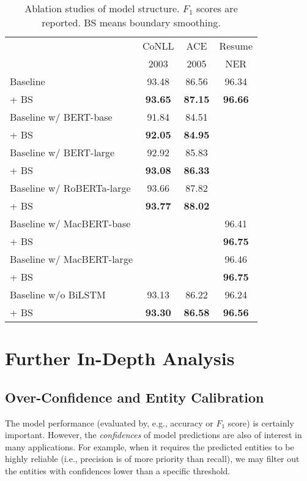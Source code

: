 \documentclass[11pt]{article}
\begin{document}
\begin{table}[t]
    \centering \small
    \begin{tabular}{lccc}
        \toprule
         & CoNLL & ACE  & Resume \\
         & 2003  & 2005 & NER \\
        \midrule
        Baseline                  & 93.48 & 86.56 & 96.34 \\
        \quad + BS                & \textbf{93.65} & \textbf{87.15} & \textbf{96.66} \\
        \midrule
        Baseline w/ BERT-base     & 91.84 & 84.51 & \\
        \quad + BS                & \textbf{92.05} & \textbf{84.95} & \\
        \midrule
        Baseline w/ BERT-large    & 92.92 & 85.83 & \\
        \quad + BS                & \textbf{93.08} & \textbf{86.33} & \\
        \midrule
        Baseline w/ RoBERTa-large & 93.66 & 87.82 & \\
        \quad + BS                & \textbf{93.77} & \textbf{88.02} & \\
        \midrule
        Baseline w/ MacBERT-base  &  &  & 96.41 \\
        \quad + BS                &  &  & \textbf{96.75} \\
        \midrule
        Baseline w/ MacBERT-large &  &  & 96.46 \\
        \quad + BS                &  &  & \textbf{96.75} \\
        \midrule
        Baseline w/o BiLSTM       & 93.13 & 86.22 & 96.24 \\
        \quad + BS                & \textbf{93.30} & \textbf{86.58} & \textbf{96.56} \\
        \bottomrule
    \end{tabular}
    \caption{Ablation studies of model structure. $F_1$ scores are reported. BS means boundary smoothing.}
    \label{tab:ablation-structure}
\end{table}


\section{Further In-Depth Analysis}
\subsection{Over-Confidence and Entity Calibration}
The model performance (evaluated by, e.g., accuracy or $F_1$ score) is certainly important. However, the \emph{confidences} of model predictions are also of interest in many applications. For example, when it requires the predicted entities to be highly reliable (i.e., precision is of more priority than recall), we may filter out the entities with confidences lower than a specific threshold. 
\end{document}
